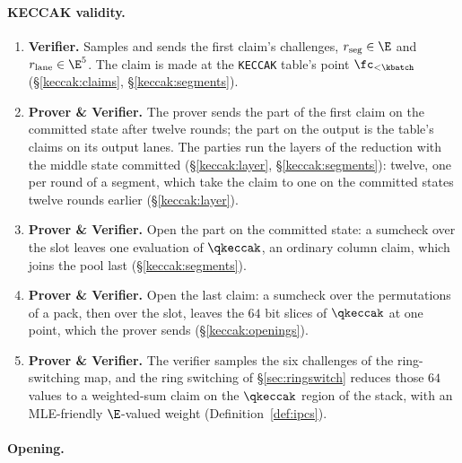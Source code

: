 \paragraph{KECCAK validity.}

\begin{enumerate}
\item \textbf{Verifier.} Samples and sends the first claim's challenges, $r_{\mathrm{seg}}\in\E$ and $r_{\mathrm{lane}}\in\E^{5}$. The claim is made at the \texttt{KECCAK} table's point $\fc_{<\kbatch}$ (\S\ref{keccak:claims}, \S\ref{keccak:segments}).
\item \textbf{Prover \& Verifier.} The prover sends the part of the first claim on the committed state after twelve rounds; the part on the output is the table's claims on its output lanes. The parties run the layers of the reduction with the middle state committed (\S\ref{keccak:layer}, \S\ref{keccak:segments}): twelve, one per round of a segment, which take the claim to one on the committed states twelve rounds earlier (\S\ref{keccak:layer}).
\item \textbf{Prover \& Verifier.} Open the part on the committed state: a sumcheck over the slot leaves one evaluation of $\qkeccak$, an ordinary column claim, which joins the pool last (\S\ref{keccak:segments}).
\item \textbf{Prover \& Verifier.} Open the last claim: a sumcheck over the permutations of a pack, then over the slot, leaves the $64$ bit slices of $\qkeccak$ at one point, which the prover sends (\S\ref{keccak:openings}).
\item \textbf{Prover \& Verifier.} The verifier samples the six challenges of the ring-switching map, and the ring switching of \S\ref{sec:ringswitch} reduces those $64$ values to a weighted-sum claim on the $\qkeccak$ region of the stack, with an MLE-friendly $\E$-valued weight (Definition~\ref{def:ipcs}).
\end{enumerate}

\paragraph{Opening.}

